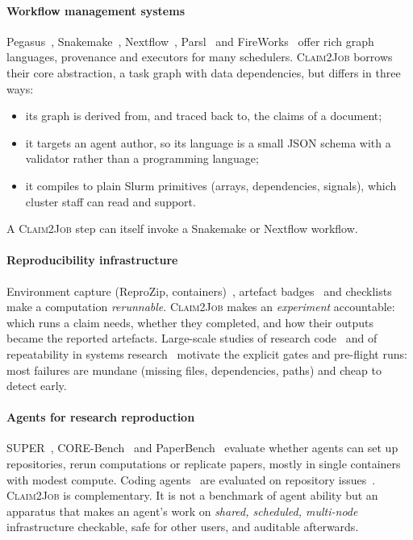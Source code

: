 \documentclass[pdflatex,sn-mathphys-num]{sn-jnl}
\theoremstyle{thmstyleone}%
\theoremstyle{thmstyletwo}%
\theoremstyle{thmstylethree}%
\newcommand{\cj}{\textsc{Claim2Job}}
\begin{document}
\paragraph{Workflow management systems} Pegasus~\cite{deelman2015pegasus},
Snakemake~\cite{molder2021snakemake}, Nextflow~\cite{ditommaso2017nextflow},
Parsl~\cite{babuji2019parsl} and FireWorks~\cite{jain2015fireworks} offer rich
graph languages, provenance and executors for many schedulers. \cj{} borrows
their core abstraction, a task graph with data dependencies, but differs in
three ways:
\begin{itemize}[leftmargin=1.4em, itemsep=1pt]
\item its graph is derived from, and traced back to, the claims of a document;
\item it targets an agent author, so its language is a small JSON schema with
a validator rather than a programming language;
\item it compiles to plain Slurm primitives (arrays, dependencies, signals),
which cluster staff can read and support.
\end{itemize}
A \cj{} step can itself invoke a Snakemake or Nextflow workflow.

\paragraph{Reproducibility infrastructure} Environment capture (ReproZip,
containers)~\cite{chirigati2016reprozip,kurtzer2017singularity}, artefact
badges~\cite{acm2020badges} and checklists~\cite{pineau2021improving} make a
computation \emph{rerunnable}. \cj{} makes an \emph{experiment} accountable:
which runs a claim needs, whether they completed, and how their outputs became
the reported artefacts. Large-scale studies of research
code~\cite{trisovic2022large,pimentel2019large} and of repeatability in systems
research~\cite{collberg2016repeatability} motivate the explicit gates and
pre-flight runs: most failures are mundane (missing files, dependencies,
paths) and cheap to detect early.

\paragraph{Agents for research reproduction} SUPER~\cite{bogin2024super},
CORE-Bench~\cite{siegel2024corebench} and PaperBench~\cite{starace2025paperbench}
evaluate whether agents can set up repositories, rerun computations or
replicate papers, mostly in single containers with modest compute. Coding
agents~\cite{yang2024sweagent,wang2025openhands} are evaluated on repository
issues~\cite{jimenez2024swebench}. \cj{} is complementary. It is not a
benchmark of agent ability but an apparatus that makes an agent's work on
\emph{shared, scheduled, multi-node} infrastructure checkable, safe for other
users, and auditable afterwards.
\end{document}

